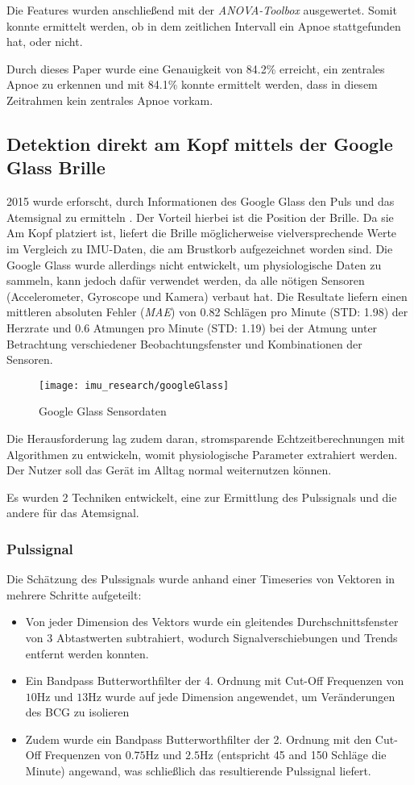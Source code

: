 Die Features wurden anschließend mit der \textit{ANOVA-Toolbox} ausgewertet.
Somit konnte ermittelt werden, ob in dem zeitlichen Intervall ein Apnoe stattgefunden hat, oder nicht.

Durch dieses Paper wurde eine Genauigkeit von 84.2\% erreicht, ein zentrales Apnoe zu erkennen und mit 84.1\% konnte ermittelt werden, dass in diesem Zeitrahmen kein zentrales Apnoe vorkam.


\subsection{Detektion direkt am Kopf mittels der Google Glass Brille}
2015 wurde erforscht, durch Informationen des Google Glass den Puls und das Atemsignal zu ermitteln \cite{hernandez_cardiac_nodate}. 
Der Vorteil hierbei ist die Position der Brille. 
Da sie Am Kopf platziert ist, liefert die Brille möglicherweise vielversprechende Werte im Vergleich zu IMU-Daten, die am Brustkorb aufgezeichnet worden sind.
Die Google Glass wurde allerdings nicht entwickelt, um physiologische Daten zu sammeln, kann jedoch dafür verwendet werden, da alle nötigen Sensoren (Accelerometer, Gyroscope und Kamera) verbaut hat.
Die Resultate liefern einen mittleren absoluten Fehler (\textit{MAE}) von 0.82 Schlägen pro Minute (STD: 1.98) der Herzrate und 0.6 Atmungen pro Minute (STD: 1.19) bei der Atmung unter Betrachtung verschiedener Beobachtungsfenster und Kombinationen der Sensoren. 
\begin{figure}[ht]
    \centering
    \texttt{[image: imu\_research/googleGlass]}
    \caption{Google Glass Sensordaten \cite{hernandez_cardiac_nodate}}
    \label{imu_research_google_glass}
\end{figure}
Die Herausforderung lag zudem daran, stromsparende Echtzeitberechnungen mit Algorithmen zu entwickeln, womit physiologische Parameter extrahiert werden. Der Nutzer soll das Gerät im Alltag normal weiternutzen können. 

Es wurden 2 Techniken entwickelt, eine zur Ermittlung des Pulssignals und die andere für das Atemsignal.
\subsubsection{Pulssignal}
Die Schätzung des Pulssignals wurde anhand einer Timeseries von Vektoren in mehrere Schritte aufgeteilt:
\begin{itemize}
    \item Von jeder Dimension des Vektors wurde ein gleitendes Durchschnittsfenster von 3 Abtastwerten subtrahiert, wodurch Signalverschiebungen und Trends entfernt werden konnten.
    \item Ein Bandpass Butterworthfilter der 4. Ordnung mit Cut-Off Frequenzen von $10 \si{\hertz}$ und $13 \si{\hertz}$ wurde auf jede Dimension angewendet, um Veränderungen des BCG zu isolieren
    \item Zudem wurde ein Bandpass Butterworthfilter der 2. Ordnung mit den Cut-Off Frequenzen von $0.75 \si{\hertz}$ und $2.5 \si{\hertz}$ (entspricht 45 and 150 Schläge die Minute) angewand, was schließlich das resultierende Pulssignal liefert.
\end{itemize}

